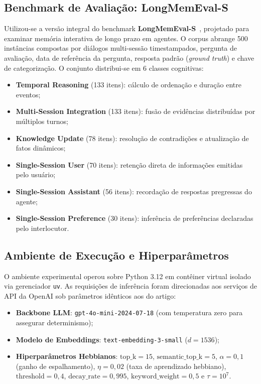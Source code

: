 \documentclass[10pt,conference,twocolumn]{IEEEtran}
\begin{document}
\subsection{Benchmark de Avaliação: LongMemEval-S}
Utilizou-se a versão integral do benchmark \textbf{LongMemEval-S}~\cite{longmemeval2025}, projetado para examinar memória interativa de longo prazo em agentes. O corpus abrange 500 instâncias compostas por diálogos multi-sessão timestampados, pergunta de avaliação, data de referência da pergunta, resposta padrão (\textit{ground truth}) e chave de categorização. O conjunto distribui-se em 6 classes cognitivas:
\begin{itemize}
    \item \textbf{Temporal Reasoning} (133 itens): cálculo de ordenação e duração entre eventos;
    \item \textbf{Multi-Session Integration} (133 itens): fusão de evidências distribuídas por múltiplos turnos;
    \item \textbf{Knowledge Update} (78 itens): resolução de contradições e atualização de fatos dinâmicos;
    \item \textbf{Single-Session User} (70 itens): retenção direta de informações emitidas pelo usuário;
    \item \textbf{Single-Session Assistant} (56 itens): recordação de respostas pregressas do agente;
    \item \textbf{Single-Session Preference} (30 itens): inferência de preferências declaradas pelo interlocutor.
\end{itemize}

\subsection{Ambiente de Execução e Hiperparâmetros}
O ambiente experimental operou sobre Python 3.12 em contêiner virtual isolado via gerenciador \texttt{uv}. As requisições de inferência foram direcionadas aos serviços de API da OpenAI sob parâmetros idênticos aos do artigo:
\begin{itemize}
    \item \textbf{Backbone LLM}: \texttt{gpt-4o-mini-2024-07-18} (com temperatura zero para assegurar determinismo);
    \item \textbf{Modelo de Embeddings}: \texttt{text-embedding-3-small} ($d = 1536$);
    \item \textbf{Hiperparâmetros Hebbianos}: $\text{top\_k} = 15$, $\text{semantic\_top\_k} = 5$, $\alpha = 0,1$ (ganho de espalhamento), $\eta = 0,02$ (taxa de aprendizado hebbiano), $\text{threshold} = 0,4$, $\text{decay\_rate} = 0,995$, $\text{keyword\_weight} = 0,5$ e $\tau = 10^7$.
\end{itemize}
\end{document}
